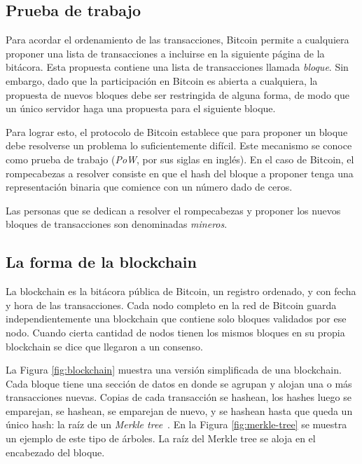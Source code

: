  \subsection{Prueba de trabajo}

 Para acordar el ordenamiento de las transacciones, Bitcoin permite a cualquiera proponer una lista
 de transacciones a incluirse en la siguiente página de la bitácora.
 Esta propuesta contiene una lista de transacciones llamada \textit{bloque}.
 Sin embargo, dado que la participación en Bitcoin es abierta a cualquiera, la propuesta de nuevos
 bloques debe ser restringida de alguna forma, de modo que un único servidor haga una propuesta
 para el siguiente bloque.

Para lograr esto, el protocolo de Bitcoin establece que para proponer un bloque debe resolverse
un problema lo suficientemente difícil.
%
Este mecanismo se conoce como prueba de trabajo (\textit{PoW}, por sus siglas en inglés).
%
En el caso de Bitcoin, el rompecabezas a resolver consiste en que el hash del bloque a proponer
tenga una representación binaria que comience con un número dado de ceros.

%
Las personas que se dedican a resolver el rompecabezas y proponer los nuevos bloques de transacciones
son denominadas \textit{mineros}.

\subsection{La forma de la blockchain}

La blockchain es la bitácora pública de Bitcoin, un registro ordenado, y con fecha y hora de las transacciones.
%
Cada nodo completo en la red de Bitcoin guarda independientemente una blockchain que contiene solo
bloques validados por ese nodo.
%
Cuando cierta cantidad de nodos tienen los mismos bloques en su propia blockchain
se dice que llegaron a un consenso. 

La Figura \ref{fig:blockchain} muestra una versión simplificada de una blockchain.
Cada bloque tiene una sección de datos en donde
se agrupan y alojan una o más transacciones nuevas. Copias de cada transacción se hashean, los hashes luego
se emparejan, se hashean, se emparejan de nuevo, y se hashean hasta que queda un único hash: la raíz de un
\textit{Merkle tree}~\cite{merkle.tree}. 
En la Figura \ref{fig:merkle-tree} se muestra un ejemplo de este tipo de árboles.
La raíz del Merkle tree se aloja en el encabezado del bloque.

